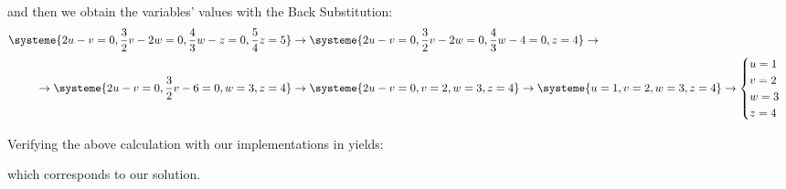 and then we obtain the variables' values with the Back Substitution:
\begin{equation*}
  \begin{split}
    \systeme{2u-v=0,\frac{3}{2}v-2w=0,\frac{4}{3}w-z=0,\frac{5}{4}z=5}
    &\rightarrow
    \systeme{2u-v=0,\frac{3}{2}v-2w=0,\frac{4}{3}w-4=0,z=4}
    \rightarrow\\
    \rightarrow
    \systeme{2u-v=0,\frac{3}{2}v-6=0,w=3,z=4}
    &\rightarrow
    \systeme{2u-v=0,v=2,w=3,z=4}
    \rightarrow
    \systeme{u=1,v=2,w=3,z=4}
    \rightarrow
    \begin{cases}
    u=1\\
    v=2\\
    w=3\\
    z=4
    \end{cases}
\end{split}
\end{equation*}

Verifying the above calculation with our implementations in \MATLAB yields:

which corresponds to our solution.
